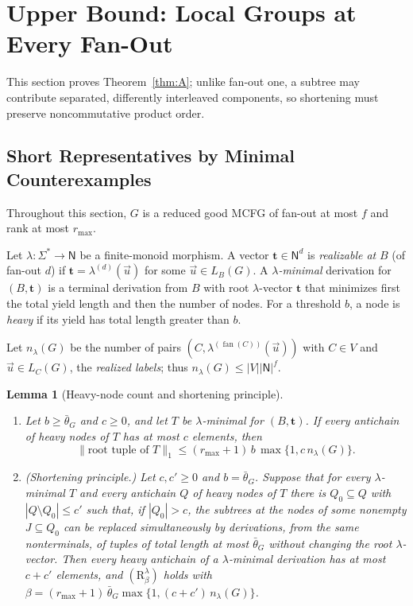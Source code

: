\documentclass[11pt]{article}
\numberwithin{equation}{section}
\theoremstyle{plain}
\newtheorem{lemma}[theorem]{Lemma}
\theoremstyle{definition}
\theoremstyle{remark}
\newcommand{\tuple}[1]{\vec{#1}}
\newcommand{\fan}{\operatorname{fan}}
\theoremstyle{plain}
\begin{document}
\section{Upper Bound: Local Groups at Every Fan-Out}
\label{sec:upper}

This section proves Theorem~\ref{thm:A}; unlike fan-out one,
a subtree may contribute separated, differently interleaved
components, so shortening must preserve noncommutative product order.

\subsection{Short Representatives by Minimal Counterexamples}
\label{subsec:group-invariants}

Throughout this section, $G$ is a reduced good MCFG of
fan-out at most $f$ and rank at most $r_{\max}$.

Let $\lambda:\Sigma^*\to\mathsf N$ be a finite-monoid morphism.  A vector
$\mathbf t\in\mathsf N^d$ is \emph{realizable at} $B$ (of fan-out $d$) if
$\mathbf t=\lambda^{(d)}(\tuple u)$ for some $\tuple u\in L_B(G)$.  A
\emph{$\lambda$-minimal} derivation for $(B,\mathbf t)$ is a terminal derivation
from $B$ with root $\lambda$-vector $\mathbf t$ that minimizes first the total
yield length and then the number of nodes.  For a threshold $b$, a node is
\emph{heavy} if its yield has total length greater than $b$.

Let $n_\lambda(G)$ be the number of pairs $(C,\lambda^{(\fan(C))}(\tuple u))$ with $C\in V$ and
$\tuple u\in L_C(G)$, the \emph{realized labels}; thus $n_\lambda(G)\le|V||\mathsf N|^f$.

\begin{lemma}[Heavy-node count and shortening principle]
\label{lem:heavy-node-count}
\begin{enumerate}[label=\textup{(\roman*)},leftmargin=*]
\item Let $b\ge\bar\theta_G$ and $c\ge0$, and let $T$ be $\lambda$-minimal for
$(B,\mathbf t)$.  If every antichain of heavy nodes of $T$ has at most $c$
elements, then
\[
 \|\text{root tuple of }T\|_1\le(r_{\max}+1)\,b\,\max\{1,c\,n_\lambda(G)\}.
\]
\item \emph{(Shortening principle.)}  Let $c,c'\ge0$ and $b=\bar\theta_G$.  Suppose that
for every $\lambda$-minimal $T$ and every antichain $Q$ of heavy nodes of $T$ there is
$Q_0\subseteq Q$ with $|Q\setminus Q_0|\le c'$ such that, if $|Q_0|>c$, the subtrees at
the nodes of some nonempty $J\subseteq Q_0$ can be replaced simultaneously by
derivations, from the same nonterminals, of tuples of total length at most
$\bar\theta_G$ without changing the root $\lambda$-vector.  Then every heavy antichain of
a $\lambda$-minimal derivation has at most $c+c'$ elements, and
$(\mathrm R_\beta^\lambda)$ holds with
$\beta=(r_{\max}+1)\,\bar\theta_G\max\{1,(c+c')\,n_\lambda(G)\}$.
\end{enumerate}
\end{lemma}
\end{document}
